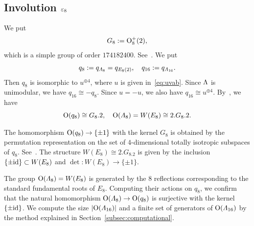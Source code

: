 \documentclass{amsart} %
\begin{document}
\subsection{Involution $\varepsilon_8$}\label{subsec:vep8}
%
We put
\[
G_8:=\mathord{\mathrm{O}}^+_8(2), 
\]
which is a simple group of order %
$174182400$.
See~\cite[page 85]{MR827219}.
%
%
We put
\[
q_8:=q_{\varLambda_8}=q_{ E_8(2)},
\quad
q_{16}:=q_{\varLambda_{16}}.
\]
Then $q_8$ 
is isomorphic to $u^{\oplus 4}$,
where $u$ is given in~\eqref{eq:uvab}.
Since $\Lambda$ is unimodular, 
we have $q_{16}\cong -q_8$.
Since $u= -u$, 
we also have 
$q_{16}\cong u^{\oplus 4}$.
By~\cite[page~85]{MR827219}, 
we have
\[
\mathord{\mathrm{O}}(q_8)\cong G_8.2, 
\quad 
\mathord{\mathrm{O}}(\varLambda_8)=W(E_8)\cong 2.G_8.2.
\]
%
\begin{remark}\label{rem:2G2}
The homomorphism $\mathord{\mathrm{O}}(q_8)\to \{\pm 1\}$ %
with the kernel $G_8$
is obtained by the permutation representation on
 the set of $4$-dimensional totally isotropic subspaces of 
$q_8$.
See~\cite[Section 3.8]{Wilson2009}.
The structure $W(E_8)\cong 2.G_8.2$ is given by
the inclusion $\{\pm \mathord{\mathrm{id}}\}\subset W(E_8)$ and $\det\colon W(E_8)\to \{\pm 1\}$.
\end{remark}
%
The group $\mathord{\mathrm{O}}(\varLambda_8)=W(E_8)$
is generated by the $8$ reflections
corresponding to the standard fundamental roots of $E_8$.
Computing their actions on $q_8$,
we confirm that 
 the natural homomorphism $\mathord{\mathrm{O}}(\varLambda_8)\to \mathord{\mathrm{O}}(q_8)$ is surjective
with the kernel $\{\pm \mathord{\mathrm{id}}\}$.
We compute
the size $|\mathord{\mathrm{O}}(\varLambda_{16})|$ and a finite set of generators of $ \mathord{\mathrm{O}}(\varLambda_{16})$
by the method 
explained in Section~\ref{subsec:computational}.
% 
\end{document}
